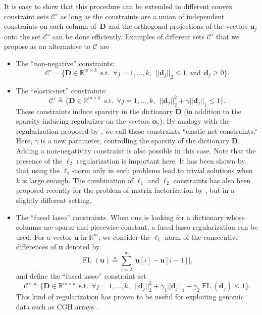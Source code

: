 \documentclass[twoside,11pt]{article}
\def\alphab{{\boldsymbol\alpha}}
\def\D{{\mathbf D}}
\def\d{{\mathbf d}}
\def\C{{\mathcal C}}
\def\d{{\mathbf d}}
\def\u{{\mathbf u}}
\def\Real{{\mathbb R}}
\def\u{{\mathbf u}}
\def\FL{\operatorname{FL}}
\def\st{~~\text{s.t.}~~}
\def\defin{\stackrel{\vartriangle}{=}}
\begin{document}
It is easy to show that this procedure can be extended to different convex
constraint sets $\C'$ as long as the constraints are a union of independent constraints
on each column of~$\D$ and the orthogonal projections of the vectors $\u_j$ onto the
set $\C'$ can be done efficiently.
Examples of different sets $\C'$ that we propose as an alternative to $\C$ are
\begin{itemize}
   \item The ``non-negative'' constraints: 
      \begin{displaymath}
         \C' = \{ \D \in \Real^{m \times k} \st \forall j=1,\ldots,k,~~ ||\d_j||_2 \leq 1 ~~\text{and}~~ \d_j \geq 0 \}.
      \end{displaymath}
   \item The ``elastic-net'' constraints:
      \begin{displaymath}
         \C' \defin \{ \D \in \Real^{m \times k} \st \forall
         j=1,\ldots,k,~~ ||\d_j||_2^2 + \gamma||\d_j||_1 \leq 1
         \}.
      \end{displaymath}
      These constraints induce sparsity in the dictionary $\D$ (in addition to the
      sparsity-inducing regularizer on the vectors $\alphab_i$).
      By analogy with the regularization proposed by \citet{zou}, we call these
      constraints ``elastic-net constraints.'' Here, $\gamma$ is a new parameter,
      controlling the sparsity of the dictionary $\D$. Adding
      a non-negativity constraint is also possible in this case. 
      Note that the presence of the $\ell_2$ regularization is important here.
      It has been shown
      by \citet{bach3} that using the $\ell_1$-norm only in such problems
      lead to trivial solutions when $k$ is large enough.
      The combination of $\ell_1$ and $\ell_2$ constraints has also been proposed
      recently for the problem of matrix factorization by \citet{witten}, but
      in a slightly different setting. 
   \item The ``fused lasso'' \citep{tibshirani2} constraints. When one is
      looking for a dictionary whose columns are sparse and piecewise-constant, a fused lasso regularization can be used.
      For a vector $\u$ in $\Real^m$, we consider the $\ell_1$-norm of 
      the consecutive differences of $\u$ denoted by
      \begin{displaymath}
         \FL(\u) \defin \sum_{i=2}^m |\u[i]-\u[i-1]|,
      \end{displaymath}
      and define the ``fused lasso'' constraint set
      \begin{displaymath}
         \C' \defin \{ \D \in \Real^{m \times k} \st \forall
         j=1,\ldots,k,~~ ||\d_j||_2^2 + \gamma_1||\d_j||_1 + \gamma_2 \FL(\d_j) \leq 1
         \}.
      \end{displaymath}
      This kind of regularization has proven to be useful for 
      exploiting genomic data such as CGH arrays \citep{tibshirani3}.
\end{itemize}
\end{document}
